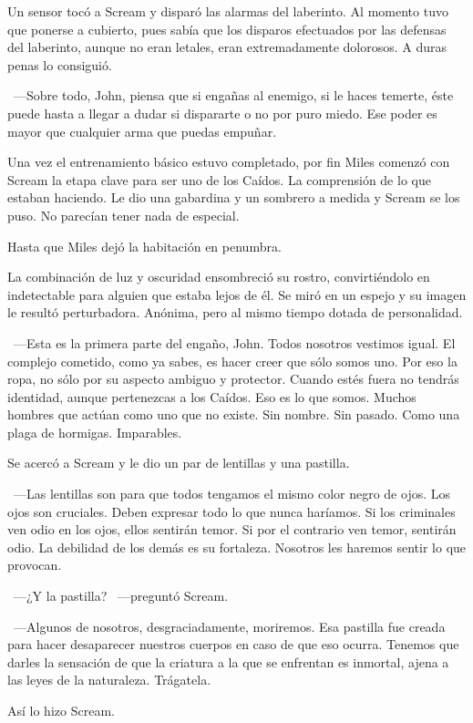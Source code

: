 Un sensor tocó a Scream y disparó las alarmas del laberinto. Al momento tuvo que ponerse a cubierto, pues sabía que los disparos efectuados por las defensas del laberinto, aunque no eran letales, eran extremadamente dolorosos. A duras penas lo consiguió.

~---Sobre todo, John, piensa que si engañas al enemigo, si le haces temerte, éste puede hasta a llegar a dudar si dispararte o no por puro miedo. Ese poder es mayor que cualquier arma que puedas empuñar.

Una vez el entrenamiento básico estuvo completado, por fin Miles comenzó con Scream la etapa clave para ser uno de los Caídos. La comprensión de lo que estaban haciendo. Le dio una gabardina y un sombrero a medida y Scream se los puso. No parecían tener nada de especial.

Hasta que Miles dejó la habitación en penumbra.

La combinación de luz y oscuridad ensombreció su rostro, convirtiéndolo en indetectable para alguien que estaba lejos de él. Se miró en un espejo y su imagen le resultó perturbadora. Anónima, pero al mismo tiempo dotada de personalidad.

~---Esta es la primera parte del engaño, John. Todos nosotros vestimos igual. El complejo cometido, como ya sabes, es hacer creer que sólo somos uno. Por eso la ropa, no sólo por su aspecto ambiguo y protector. Cuando estés fuera no tendrás identidad, aunque pertenezcas a los Caídos. Eso es lo que somos. Muchos hombres que actúan como uno que no existe. Sin nombre. Sin pasado. Como una plaga de hormigas. Imparables.

Se acercó a Scream y le dio un par de lentillas y una pastilla.

~---Las lentillas son para que todos tengamos el mismo color negro de ojos. Los ojos son cruciales. Deben expresar todo lo que nunca haríamos. Si los criminales ven odio en los ojos, ellos sentirán temor. Si por el contrario ven temor, sentirán odio. La debilidad de los demás es su fortaleza. Nosotros les haremos sentir lo que provocan.

~---¿Y la pastilla? ~---preguntó Scream.

~---Algunos de nosotros, desgraciadamente, moriremos. Esa pastilla fue creada para hacer desaparecer nuestros cuerpos en caso de que eso ocurra. Tenemos que darles la sensación de que la criatura a la que se enfrentan es inmortal, ajena a las leyes de la naturaleza. Trágatela.

Así lo hizo Scream.

